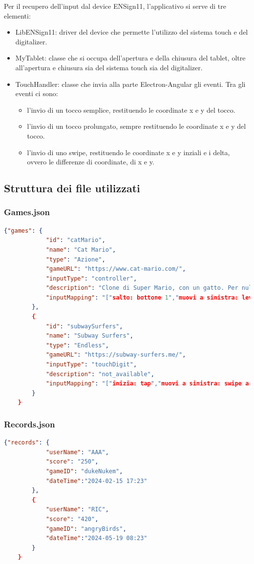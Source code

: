 Per il recupero dell'input dal device ENSign11, l'applicativo si serve di tre elementi:
\begin{itemize}
    \item LibENSign11: driver del device che permette l'utilizzo del sistema touch e del digitalizer.
    \item MyTablet: classe che si occupa dell'apertura e della chiusura del tablet, oltre all'apertura e chiusura sia del sistema touch sia del digitalizer.
    \item TouchHandler: classe che invia alla parte Electron-Angular gli eventi. Tra gli eventi ci sono: \begin{itemize}
        \item l'invio di un tocco semplice, restituendo le coordinate x e y del tocco.
        \item l'invio di un tocco prolungato, sempre restituendo le coordinate x e y del tocco.
        \item l'invio di uno swipe, restituendo le coordinate x e y inziali e i delta, ovvero le differenze di coordinate, di x e y. 
    \end{itemize}
\end{itemize}
\subsection{Struttura dei file utilizzati}
\label{subsec:strutturaFile}
\subsubsection{Games.json}
\begin{lstlisting}[language=json,firstnumber=1]
    {"games": {
            "id": "catMario",
            "name": "Cat Mario",
            "type": "Azione",
            "gameURL": "https://www.cat-mario.com/",
            "inputType": "controller",
            "description": "Clone di Super Mario, con un gatto. Per nulla stressante!",
            "inputMapping": "["salto: bottone 1","muovi a sinistra: leva D-Pad sinistra","muovi a destra: leva D-Pad destra"]"
        },
        {
            "id": "subwaySurfers",
            "name": "Subway Surfers",
            "type": "Endless",
            "gameURL": "https://subway-surfers.me/",
            "inputType": "touchDigit",
            "description": "not_available",
            "inputMapping": "["inizia: tap","muovi a sinistra: swipe a sinistra","muovi a destra: swipe a destra","salto: swipe in alto","rotolata:swipe in basso"]"
        }
    }
\end{lstlisting}
\subsubsection{Records.json}
\begin{lstlisting}[language=json,firstnumber=1]
    {"records": {
            "userName": "AAA",
            "score": "250",
            "gameID": "dukeNukem",
            "dateTime":"2024-02-15 17:23"
        },
        {
            "userName": "RIC",
            "score": "420",
            "gameID": "angryBirds",
            "dateTime":"2024-05-19 08:23"
        }
    }
\end{lstlisting}